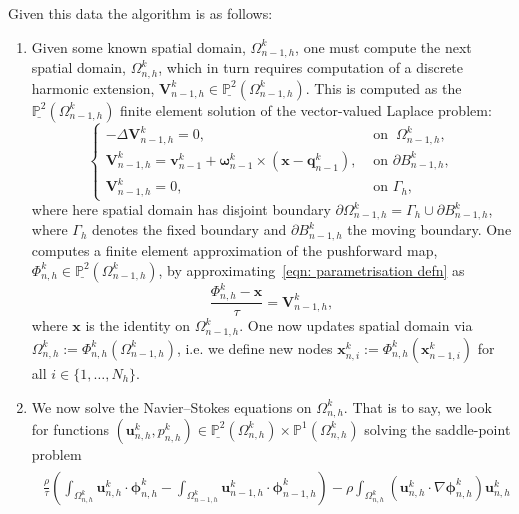 \documentclass[a4paper]{amsart}
\numberwithin{equation}{section}
\newcommand{\grad}{\nabla}
\theoremstyle{plain}
\newcommand{\mbf}[1]{\mathbf{#1}}
\newcommand{\mbb}[1]{\mathbb{#1}}
\begin{document}
Given this data the algorithm is as follows:
\begin{enumerate}
    \item Given some known spatial domain, $\Omega_{n-1,h}^k$, one must compute the next spatial domain, $\Omega_{n,h}^k$, which in turn requires computation of a discrete harmonic extension, $\mbf{V}_{n-1,h}^k \in \underline{\mbb{P}^2}(\Omega_{n-1,h}^k)$.
    This is computed as the $\underline{\mbb{P}^2}(\Omega_{n-1,h}^k)$ finite element solution of the vector-valued Laplace problem:
    \begin{equation}
        \begin{cases}
			-\Delta \mbf{V}_{n-1,h}^k = 0, &\text{ on }\ \Omega_{n-1,h}^k,\\
			\mbf{V}_{n-1,h}^k = \mbf{v}^k_{n-1} + \boldsymbol{\omega}^k_{n-1} \times (\mbf{x} - \mbf{q}^k_{n-1}), &\text{ on } \partial B_{n-1,h}^k,\\
			\mbf{V}_{n-1,h}^k = 0, &\text{ on } \Gamma_h,
		\end{cases}
        \label{eqn: finite element harmonic extension}
    \end{equation}
    where here spatial domain has disjoint boundary $\partial \Omega_{n-1,h}^k = \Gamma_h \cup \partial B_{n-1,h}^k$, where $\Gamma_h$ denotes the fixed boundary and $\partial B_{n-1,h}^k$ the moving boundary.
    One computes a finite element approximation of the pushforward map, $\Phi^k_{n,h} \in \underline{\mbb{P}^2}(\Omega_{n-1,h}^k)$, by approximating~\eqref{eqn: parametrisation defn} as
    \begin{equation}
        \frac{\Phi^k_{n,h} - \mbf{x}}{\tau} = \mbf{V}_{n-1,h}^k,
        \label{eqn: finite element nodal update}
    \end{equation}
    where $\mbf{x}$ is the identity on $\Omega_{n-1,h}^k$.
    One now updates spatial domain via $\Omega_{n,h}^k := \Phi_{n,h}^k(\Omega_{n-1,h}^k)$, i.e. we define new nodes $\mbf{x}^k_{n,i} := \Phi_{n,h}^k(\mbf{x}^k_{n-1,i})$ for all $i \in \{1,\ldots, N_h\}$.
    \item We now solve the Navier--Stokes equations on $\Omega_{n,h}^k$.
    That is to say, we look for functions $(\mbf{u}_{n,h}^k, p_{n,h}^k) \in \underline{\mbb{P}^2}(\Omega_{n,h}^k) \times \mbb{P}^1(\Omega_{n,h}^k)$ solving the saddle-point problem
    \begin{subequations}
        \begin{gather}
        \begin{aligned}
            \frac{\rho}{\tau} \left(\int_{\Omega_{n,h}^k} \mbf{u}_{n,h}^k \cdot \boldsymbol{\phi}_{n,h}^k - \int_{\Omega_{n-1,h}^k} \mbf{u}_{n-1,h}^k \cdot \boldsymbol{\phi}_{n-1,h}^k \right) - \rho \int_{\Omega_{n,h}^k} (\mbf{u}_{n,h}^k \cdot \grad \boldsymbol{\phi}_{n,h}^k) \mbf{u}_{n,h}^k\\

\end{aligned}
\end{gather}
\end{subequations}
\end{enumerate}
\end{document}
